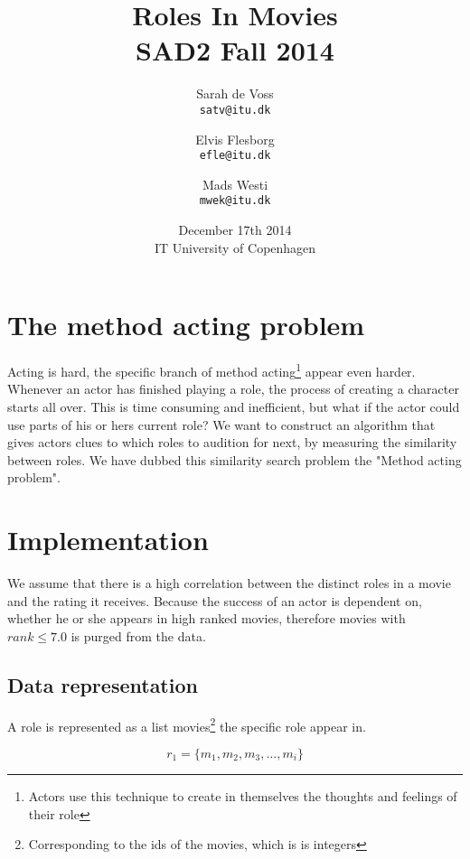 \documentclass[a4paper,11pt]{article}
\begin{document}
\setlength{\parindent}{0cm}
\setlength{\unitlength}{1mm}
\date{December 17th 2014\\ IT University of Copenhagen}
\title{Roles In Movies\\SAD2 Fall 2014}

\author{Sarah de Voss\\
\texttt{satv@itu.dk}
\and Elvis Flesborg\\
\texttt{efle@itu.dk}
\and Mads Westi\\
\texttt{mwek@itu.dk}}
\clearpage\maketitle
\newpage
\thispagestyle{empty}
\setcounter{page}{1}
\tableofcontents
\newpage

\section{The method acting problem}
Acting is hard, the specific branch of method acting\footnote{Actors use this technique to create in themselves the thoughts and feelings of their role} appear even harder. Whenever an actor has finished playing a role, the process of creating a character starts all over. This is time consuming and inefficient, but what if the actor could use parts of his or hers current role? We want to construct an algorithm that gives actors clues to which roles to audition for next, by measuring the similarity between roles. We have dubbed this similarity search problem the "Method acting problem".


\section{Implementation}
We assume that there is a high correlation between the distinct roles in a movie and the rating it receives. Because the success of an actor is dependent on, whether he or she appears in high ranked movies, therefore movies with $rank \leq 7.0$ is purged from the data.


\subsection{Data representation}
A role is represented as a list movies\footnote{Corresponding to the ids of the movies, which is is integers} the specific role appear in.

\begin{equation}
r_1 = \{m_1, m_2, m_3, \ldots , m_i\}
\end{equation}
\end{document}
